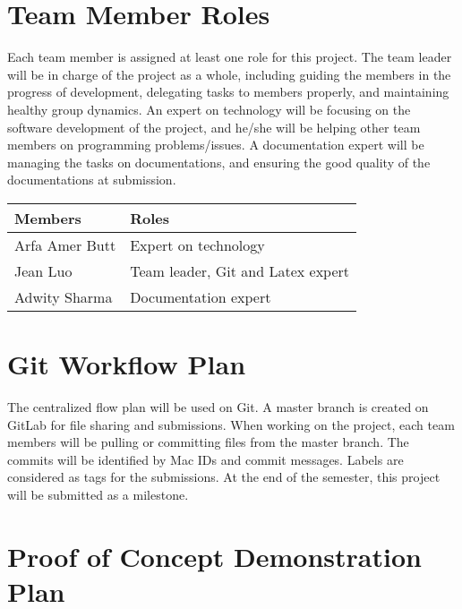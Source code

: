 \documentclass{article}
\begin{document}
\section  {Team Member Roles}

Each team member is assigned at least one role for this project. The team leader will be in charge of the project as a whole, including guiding the members in the progress of development, delegating tasks to members properly, and maintaining healthy group dynamics. An expert on technology will be focusing on the software development of the project, and he/she will be helping other team members on programming problems/issues. A documentation expert will be managing the tasks on documentations, and ensuring the good quality of the documentations at submission.\\

\begin{tabular}{|p{3cm}|p{8cm}|}
\hline
\textbf{Members}    & \textbf{Roles}                                                                                                                                                                                                                                                                                                                                                                                                                                \\\hline
Arfa Amer Butt       & Expert on technology \\\hline
Jean Luo   & Team leader, Git and Latex expert \\\hline
Adwity Sharma   & Documentation expert \\\hline
\end{tabular}

\section  { Git Workflow Plan}

The centralized flow plan will be used on Git. A master branch is created on GitLab for file sharing and submissions. When working on the project, each team members will be pulling or committing files from the master branch. The commits will be identified by Mac IDs and commit messages. Labels are considered as tags for the submissions. At the end of the semester, this project will be submitted as a milestone.\\

\section  {Proof of Concept Demonstration Plan}
\end{document}

